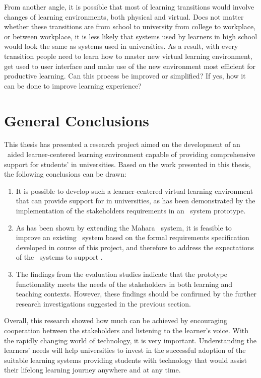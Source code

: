 From another angle, it is possible that most of learning transitions would
involve changes of learning environments, both physical and virtual. Does not
matter whether these transitions are from school to university from college to
workplace, or between workplace, it is less likely that systems used by learners
in high school would look the same as systems used in universities. As a result,
with every transition people need to learn how to master new virtual learning
environment, get used to user interface and make use of the new environment most
efficient for productive learning. Can this process be improved or simplified?
If yes, how it can be done to improve learning experience?

\section{General Conclusions}

This thesis has presented a research project aimed on the development of an
\ep~aided learner-centered learning environment capable of providing
comprehensive support for students' \LLLs in universities. Based on the work
presented in this thesis, the following conclusions can be drawn:
\begin{enumerate}
  \item It is possible to develop such a learner-centered virtual learning
  environment that can provide support for \LLLs in universities, as has been
  demonstrated by the implementation of the stakeholders requirements in an
  \ep~system prototype.
  \item As has been shown by extending the Mahara \ep~system, it is feasible to
  improve an existing \ep~system based on the formal requirements specification
  developed in course of this project, and therefore to address the
  expectations of the \ep~systems to support \LLLsn.
  \item The findings from the evaluation studies indicate that the prototype
  functionality meets the needs of the stakeholders in both learning and
  teaching contexts. However, these findings should be confirmed by the further
  research investigations suggested in the previous section.
\end{enumerate}

Overall, this research showed how much can be achieved by encouraging
cooperation between the stakeholders and listening to the learner's voice. With
the rapidly changing world of technology, it is very important. Understanding
the learners' needs will help universities to invest in the successful adoption
of the suitable learning systems providing students with technology that would
assist their lifelong learning journey anywhere and at any time.
